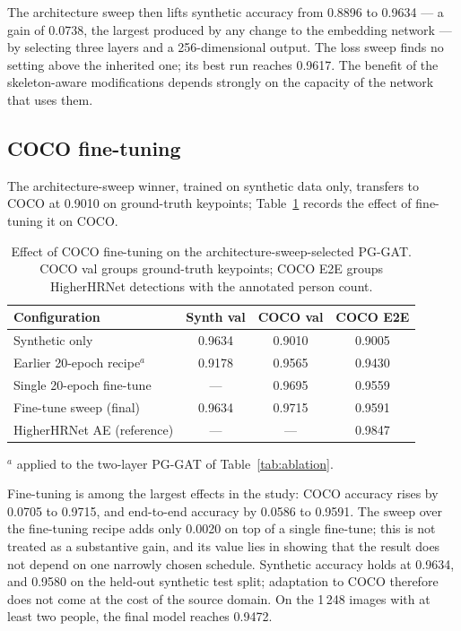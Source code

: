The architecture sweep then lifts synthetic accuracy from 0.8896 to 0.9634 ---
a gain of 0.0738, the largest produced by any change to the embedding network ---
by selecting three layers and a 256-dimensional output.
The loss sweep finds no setting above the inherited one; its best run reaches 0.9617.
The benefit of the skeleton-aware modifications depends strongly on the capacity of the network that uses them.

\subsection{COCO fine-tuning}
\label{sec:results_finetune}

The architecture-sweep winner, trained on synthetic data only, transfers to COCO at 0.9010 on ground-truth keypoints;
Table~\ref{tab:finetune} records the effect of fine-tuning it on COCO.

\begin{table}[!t]
\centering
\caption{Effect of COCO fine-tuning on the architecture-sweep-selected PG-GAT.
COCO val groups ground-truth keypoints; COCO E2E groups HigherHRNet detections with the annotated person count.}
\label{tab:finetune}
\footnotesize\setlength{\tabcolsep}{3.5pt}
\begin{tabular}{lccc}
\toprule
Configuration & Synth val & COCO val & COCO E2E \\
\midrule
Synthetic only & 0.9634 & 0.9010 & 0.9005 \\
Earlier 20-epoch recipe$^{a}$ & 0.9178 & 0.9565 & 0.9430 \\
Single 20-epoch fine-tune & --- & 0.9695 & 0.9559 \\
Fine-tune sweep (final) & 0.9634 & 0.9715 & 0.9591 \\
\midrule
HigherHRNet AE (reference) & --- & --- & 0.9847 \\
\bottomrule
\end{tabular}

\smallskip
\footnotesize $^{a}$ applied to the two-layer PG-GAT of Table~\ref{tab:ablation}.
\end{table}

Fine-tuning is among the largest effects in the study: COCO accuracy rises by 0.0705 to 0.9715,
and end-to-end accuracy by 0.0586 to 0.9591.
The sweep over the fine-tuning recipe adds only 0.0020 on top of a single fine-tune;
this is not treated as a substantive gain, and its value lies in showing that the result does not depend on one narrowly chosen schedule.
Synthetic accuracy holds at 0.9634, and 0.9580 on the held-out synthetic test split; adaptation to COCO therefore does not come at the cost of the source domain.
On the 1\,248 images with at least two people, the final model reaches 0.9472.

